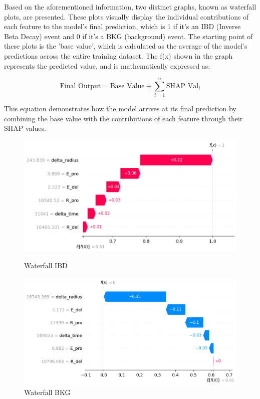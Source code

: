 Based on the aforementioned information, two distinct graphs, known as waterfall plots, are presented. These plots visually display the individual contributions of each feature to the model's final prediction, which is 1 if it's an IBD (Inverse Beta Decay) event and 0 if it's a BKG (background) event. The starting point of these plots is the 'base value', which is calculated as the average of the model's predictions across the entire training dataset. The f(x) shown in the graph represents the predicted value, and is mathematically expressed as:

\begin{equation}
	\text{Final Output} = \text{Base Value} + \sum_{i=1}^{n} \text{SHAP Val}_{i}
\end{equation}

This equation demonstrates how the model arrives at its final prediction by combining the base value with the contributions of each feature through their SHAP values.

\begin{figure}[h!]
	\centering
	\begin{minipage}{0.5\textwidth}
		\centering
		\includegraphics[width=\linewidth]{Images/Shap/waterfall_IBD}
		\caption{Waterfall IBD}
		\label{fig:waterfall_IBD}
	\end{minipage}%
	\begin{minipage}{0.5\textwidth}
		\centering
		\includegraphics[width=\linewidth]{Images/Shap/waterfall_BKG}
		\caption{Waterfall BKG}
		\label{fig:waterfall_BKG}
	\end{minipage}
\end{figure}


